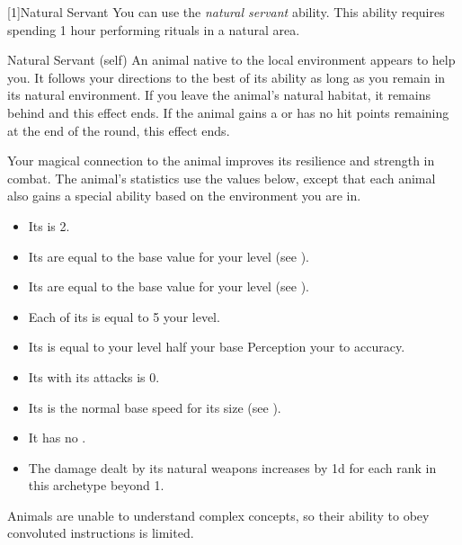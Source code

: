         [1]{Natural Servant}
        You can use the \textit{natural servant} ability.
        This ability requires spending 1 hour performing rituals in a natural area.
        \begin{attuneability}{Natural Servant}
             (self)
            \rankline
            An animal native to the local environment appears to help you.
            It follows your directions to the best of its ability as long as you remain in its natural environment.
            If you leave the animal's natural habitat, it remains behind and this effect ends.
            If the animal gains a  or has no hit points remaining at the end of the round, this effect ends.

            Your magical connection to the animal improves its resilience and strength in combat.
            The animal's statistics use the values below, except that each animal also gains a special ability based on the environment you are in.
            \begin{itemize}
                \item Its  is 2.
                \item Its  are equal to the base value for your level (see ).
                \item Its  are equal to the base value for your level (see ).
                \item Each of its  is equal to 5 \add your level.
                \item Its  is equal to your level \add half your base Perception \add your  to accuracy.
                \item Its  with its attacks is 0.
                \item Its  is the normal base speed for its size (see ).
                \item It has no .
                \item The damage dealt by its natural weapons increases by \plus1d for each rank in this archetype beyond 1.
            \end{itemize}

            Animals are unable to understand complex concepts, so their ability to obey convoluted instructions is limited.
        \end{attuneability}

